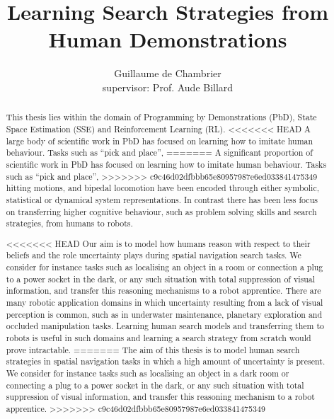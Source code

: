 \documentclass[a4paper,10pt]{article}
\title{Learning Search Strategies from Human Demonstrations}
\author[]{Guillaume de Chambrier\\supervisor: Prof. Aude Billard}
\affil[]{École Polytechnique Fédérale de Lausanne (EPFL), LASA}
\begin{document}
\maketitle

\begin{abstract}
 
This thesis lies within the domain of Programming by Demonstrations (PbD), State Space Estimation (SSE) and Reinforcement Learning (RL). 
<<<<<<< HEAD
A large body of scientific work in PbD has focused on learning how to imitate human behaviour. Tasks such as ``pick and place'', 
=======
A significant proportion of scientific work in PbD has focused on learning how to imitate human behaviour. Tasks such as ``pick and place'', 
>>>>>>> c9c46d02dfbbb65e80957987e6ed033841475349
hitting motions, and bipedal locomotion have been encoded through either symbolic, statistical or dynamical system representations. 
In contrast there has been less focus on transferring higher cognitive behaviour, such as problem solving skills and search strategies,
from humans to robots. 

<<<<<<< HEAD
Our aim is to model how humans reason with respect to their beliefs and the role uncertainty plays during spatial navigation search tasks. 
We consider for instance tasks such as localising  an object in a room or connection a plug to a power socket in the dark, 
or any such situation with total suppression of visual information, and transfer this reasoning mechanisms to a robot apprentice. 
There are many robotic application domains in which uncertainty resulting from a lack of visual perception is common, such as in underwater 
maintenance, planetary exploration and occluded manipulation tasks. Learning human search models and transferring them to robots is useful
in such domains and learning a search strategy from scratch would prove intractable.
=======
The aim of this thesis is to model human search strategies in spatial navigation tasks in which a high amount of uncertainty is present.
We consider for instance tasks such as localising  an object in a dark room or connecting a plug to a power socket in the dark, 
or any such situation with total suppression of visual information, and transfer this reasoning mechanism to a robot apprentice. 
>>>>>>> c9c46d02dfbbb65e80957987e6ed033841475349


\end{abstract}
\end{document}
